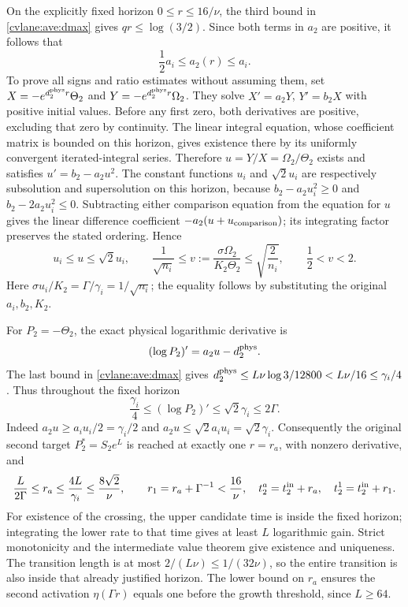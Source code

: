 On the explicitly fixed horizon $0\leq r\leq16/\nu$, the third
bound in \eqref{cvlane:ave:dmax} gives $qr\leq\log(3/2)$. Since both
terms in $a_2$ are positive, it follows that
\begin{equation}\label{cvlane:ave:coeff_interval}
 \frac12a_i\leq a_2(r)\leq a_i.
\end{equation}
To prove all signs and ratio estimates without assuming them, set
$X=-e^{d_2^{\rm phys}r}\Theta_2$ and
$Y=-e^{d_2^{\rm phys}r}\Omega_2$. They solve
$X'=a_2Y$, $Y'=b_2X$ with positive initial values.
Before any first zero, both derivatives are positive, excluding that
zero by continuity. The linear integral equation, whose coefficient
matrix is bounded on this horizon, gives existence there by its
uniformly convergent iterated-integral series.
Therefore $u=Y/X=\Omega_2/\Theta_2$ exists and satisfies
$u'=b_2-a_2u^2$. The constant functions $u_i$ and $\sqrt2u_i$
are respectively subsolution and supersolution on this horizon,
because $b_2-a_2u_i^2\geq0$ and
$b_2-2a_2u_i^2\leq0$. Subtracting either comparison equation
from the equation for $u$ gives the linear difference coefficient
$-a_2(u+u_{\rm comparison})$; its integrating factor preserves
the stated ordering. Hence
\begin{equation}\label{cvlane:ave:ratio_growth}
 u_i\leq u\leq\sqrt2u_i,\qquad
 \frac1{\sqrt{n_i}}\leq
 v:=\frac{\sigma\Omega_2}{K_2\Theta_2}
 \leq\sqrt{\frac2{n_i}},\qquad\frac12<v<2.
\end{equation}
Here $\sigma u_i/K_2=\Gamma/\gamma_i=1/\sqrt{n_i}$;
the equality follows by substituting the original $a_i,b_2,K_2$.

For $P_2=-\Theta_2$, the exact physical logarithmic derivative is
\[
 (\log P_2)'=a_2u-d_2^{\rm phys}.
\]
The last bound in \eqref{cvlane:ave:dmax} gives
$d_2^{\rm phys}\leq L\nu\log3/12800<L\nu/16
\leq\gamma_i/4$. Thus throughout the fixed horizon
\begin{equation}\label{cvlane:ave:growth_rate}
 \frac{\gamma_i}{4}\leq(\log P_2)'
      \leq\sqrt2\gamma_i\leq2\Gamma.
\end{equation}
Indeed $a_2u\geq a_iu_i/2=\gamma_i/2$ and
$a_2u\leq\sqrt2a_iu_i=\sqrt2\gamma_i$.
Consequently the original second target $P_2^*=S_2e^L$ is reached
at exactly one $r=r_a$, with nonzero derivative, and
\begin{equation}\label{cvlane:ave:second_times}
 \frac{L}{2\Gamma}\leq r_a\leq\frac{4L}{\gamma_i}
       \leq\frac{8\sqrt2}{\nu},\qquad
 r_1=r_a+\Gamma^{-1}<\frac{16}{\nu},
 \quad t_2^a=t_2^{\rm in}+r_a,
 \quad t_2^1=t_2^{\rm in}+r_1.
\end{equation}
For existence of the crossing, the upper candidate time is inside
the fixed horizon; integrating the lower rate to that time gives
at least $L$ logarithmic gain. Strict monotonicity and the intermediate
value theorem give existence and uniqueness. The transition length
is at most $2/(L\nu)\leq1/(32\nu)$, so the entire transition is
also inside that already justified horizon. The lower bound on $r_a$
ensures the second activation $\eta(\Gamma r)$ equals one before
the growth threshold, since $L\geq64$.

